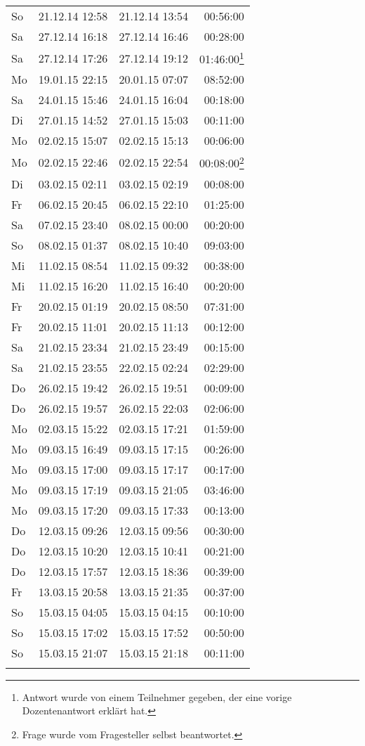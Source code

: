 \begin{longtable}{lrrr}
So & 21.12.14 12:58 & 21.12.14 13:54 & 00:56:00 \\
Sa & 27.12.14 16:18 & 27.12.14 16:46 & 00:28:00 \\
Sa & 27.12.14 17:26 & 27.12.14 19:12 & 01:46:00\footnote{Antwort wurde von einem Teilnehmer gegeben, der eine vorige Dozentenantwort erklärt hat.} \\
Mo & 19.01.15 22:15 & 20.01.15 07:07 & 08:52:00 \\
Sa & 24.01.15 15:46 & 24.01.15 16:04 & 00:18:00 \\
Di & 27.01.15 14:52 & 27.01.15 15:03 & 00:11:00 \\
Mo & 02.02.15 15:07 & 02.02.15 15:13 & 00:06:00 \\
Mo & 02.02.15 22:46 & 02.02.15 22:54 & 00:08:00\footnote{Frage wurde vom Fragesteller selbst beantwortet.} \\
Di & 03.02.15 02:11 & 03.02.15 02:19 & 00:08:00 \\
Fr & 06.02.15 20:45 & 06.02.15 22:10 & 01:25:00 \\
Sa & 07.02.15 23:40 & 08.02.15 00:00 & 00:20:00 \\
So & 08.02.15 01:37 & 08.02.15 10:40 & 09:03:00 \\
Mi & 11.02.15 08:54 & 11.02.15 09:32 & 00:38:00 \\
Mi & 11.02.15 16:20 & 11.02.15 16:40 & 00:20:00 \\
Fr & 20.02.15 01:19 & 20.02.15 08:50 & 07:31:00 \\
Fr & 20.02.15 11:01 & 20.02.15 11:13 & 00:12:00 \\
Sa & 21.02.15 23:34 & 21.02.15 23:49 & 00:15:00 \\
Sa & 21.02.15 23:55 & 22.02.15 02:24 & 02:29:00 \\
Do & 26.02.15 19:42 & 26.02.15 19:51 & 00:09:00 \\
Do & 26.02.15 19:57 & 26.02.15 22:03 & 02:06:00 \\
Mo & 02.03.15 15:22 & 02.03.15 17:21 & 01:59:00 \\
Mo & 09.03.15 16:49 & 09.03.15 17:15 & 00:26:00 \\
Mo & 09.03.15 17:00 & 09.03.15 17:17 & 00:17:00 \\
Mo & 09.03.15 17:19 & 09.03.15 21:05 & 03:46:00 \\
Mo & 09.03.15 17:20 & 09.03.15 17:33 & 00:13:00 \\
Do & 12.03.15 09:26 & 12.03.15 09:56 & 00:30:00 \\
Do & 12.03.15 10:20 & 12.03.15 10:41 & 00:21:00 \\
Do & 12.03.15 17:57 & 12.03.15 18:36 & 00:39:00 \\
Fr & 13.03.15 20:58 & 13.03.15 21:35 & 00:37:00 \\
So & 15.03.15 04:05 & 15.03.15 04:15 & 00:10:00 \\
So & 15.03.15 17:02 & 15.03.15 17:52 & 00:50:00 \\
So & 15.03.15 21:07 & 15.03.15 21:18 & 00:11:00 \\
\label{tab:erp4students}
\end{longtable}

